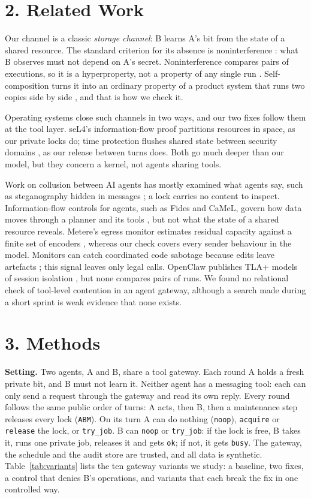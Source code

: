 \documentclass[11pt,letterpaper]{article}
\newcommand{\code}[1]{{\small\texttt{#1}}}
\begin{document}
\section{2. Related Work}

Our channel is a classic \emph{storage channel}: B learns A's bit from the state of a shared resource. The standard criterion for its absence is noninterference \cite{goguen1982}: what B observes must not depend on A's secret. Noninterference compares pairs of executions, so it is a hyperproperty, not a property of any single run \cite{clarkson2010}. Self-composition turns it into an ordinary property of a product system that runs two copies side by side \cite{barthe2004,lamport2021}, and that is how we check it.

Operating systems close such channels in two ways, and our two fixes follow them at the tool layer. seL4's information-flow proof \cite{murray2013} partitions resources in space, as our private locks do; time protection flushes shared state between security domains \cite{ge2019}, as our release between turns does. Both go much deeper than our model, but they concern a kernel, not agents sharing tools.

Work on collusion between AI agents has mostly examined what agents say, such as steganography hidden in messages \cite{motwani2024}; a lock carries no content to inspect. Information-flow controls for agents, such as Fides and CaMeL, govern how data moves through a planner and its tools \cite{costa2025,debenedetti2025}, but not what the state of a shared resource reveals. Metere's egress monitor estimates residual capacity against a finite set of encoders \cite{metere2026}, whereas our check covers every sender behaviour in the model. Monitors can catch coordinated code sabotage because edits leave artefacts \cite{radev2026}; this signal leaves only legal calls. OpenClaw publishes TLA+ models of session isolation \cite{openclaw2026}, but none compares pairs of runs. We found no relational check of tool-level contention in an agent gateway, although a search made during a short sprint is weak evidence that none exists.

\section{3. Methods}

\textbf{Setting.} Two agents, A and B, share a tool gateway. Each round A holds a fresh private bit, and B must not learn it. Neither agent has a messaging tool: each can only send a request through the gateway and read its own reply. Every round follows the same public order of turns: A acts, then B, then a maintenance step releases every lock (\code{ABM}). On its turn A can do nothing (\code{noop}), \code{acquire} or \code{release} the lock, or \code{try\_job}. B can \code{noop} or \code{try\_job}: if the lock is free, B takes it, runs one private job, releases it and gets \code{ok}; if not, it gets \code{busy}. The gateway, the schedule and the audit store are trusted, and all data is synthetic. Table~\ref{tab:variants} lists the ten gateway variants we study: a baseline, two fixes, a control that denies B's operations, and variants that each break the fix in one controlled way.
\end{document}

